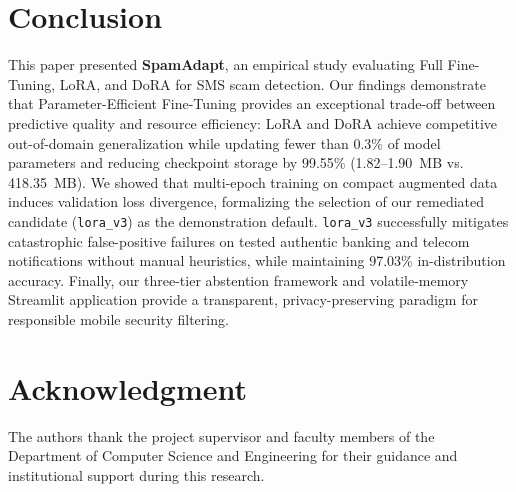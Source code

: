 \documentclass[conference]{IEEEtran}
\begin{document}
\section{Conclusion}
\label{sec:conclusion}

This paper presented \textbf{SpamAdapt}, an empirical study evaluating Full Fine-Tuning, LoRA, and DoRA for SMS scam detection. Our findings demonstrate that Parameter-Efficient Fine-Tuning provides an exceptional trade-off between predictive quality and resource efficiency: LoRA and DoRA achieve competitive out-of-domain generalization while updating fewer than 0.3\% of model parameters and reducing checkpoint storage by 99.55\% (1.82--1.90~MB vs. 418.35~MB). We showed that multi-epoch training on compact augmented data induces validation loss divergence, formalizing the selection of our remediated candidate (\texttt{lora\_v3}) as the demonstration default. \texttt{lora\_v3} successfully mitigates catastrophic false-positive failures on tested authentic banking and telecom notifications without manual heuristics, while maintaining 97.03\% in-distribution accuracy. Finally, our three-tier abstention framework and volatile-memory Streamlit application provide a transparent, privacy-preserving paradigm for responsible mobile security filtering.

\section*{Acknowledgment}
The authors thank the project supervisor and faculty members of the Department of Computer Science and Engineering for their guidance and institutional support during this research.
\end{document}
